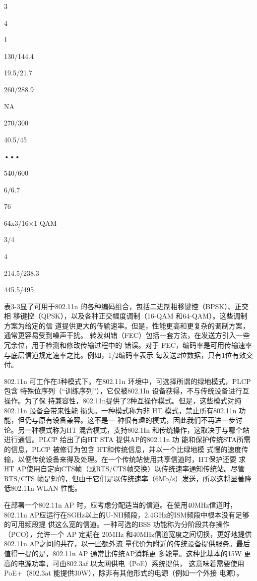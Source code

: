 3

4

1

130/144.4

19.5/21.7

260/288.9

NA

270/300

40.5/45

•••

540/600

6/6.7

76

64x3/16×1-QAM

3/4

4

214.5/238.3

445.5/495

表3-3显了可用于802.11n 的各种编码组合，包括二进制相移键控（BPSK）、正交相
移键控（QPSK），以及各种正交幅度调制（16-QAM 和64-QAM）。这些调制方案为给定的信
道提供更大的传输速率。但是，性能更高和更复杂的调制方案，通常更容易受到噪声干扰。
转发纠错（FEC）包括一套方法，在发送方引入一些冗余位，用于检测和修改传输过程中的
错误。对于 FEC，编码率是可用传输速率与底层信道规定速率之比。例如，1/2编码率表示
每发送2位数据，只有1位有效交付。

802.11n 可工作在3种模式下。在802.11n 环境中，可选择所谓的绿地模式，PLCP包含
特殊位序列（“训练序列”），它仅被802.1In 设备获得，不与传统设备进行互操作。为了保
持兼容性，802.11n提供了2种互操作模式。但是，这些模式对纯802.11n 设备会带来性能
损失。一种模式称为非 HT 模式，禁止所有802.11n 功能，但仍与原有设备兼容。这不是一
种很有趣的模式，因此我们不再进一步讨论。另一种模式称为HT 混合模式，支持802.1In
和传统操作，这取决于与哪个站进行通信。PLCP 给出了向HT STA 提供AP的802.11n 功
能和保护传统STA所需的信息，PLCP 被修订为包含 HT和传统信息，并以一个比绿地模
式慢的速度传输，以便传统设备来得及处理。在一个传统站使用共享信道时，HT保护还要
求 HT AP使用自定向CTS帧（或RTS/CTS帧交换）以传统速率通知传统站。尽管 RTS/CTS
帧是短的，但由于它们是以传统速率（6Mb/s）发送，所以这将显著降低802.11n WLAN
性能。

在部署一个802.11n AP 时，应考虑分配适当的信道。在使用40MHz信道时，802.11n
AP应运行在SGHz以上的U-NII频段，2.4GHz的ISM频段中根本没有足够的可用频段提
供这么宽的信道。一种可选的BSS 功能称为分阶段共存操作（PCO），允许一个 AP 定期在
20MHz 和40MHz信道宽度之间切换，更好地提供802.11n AP之间的共存，以一些额外流
量代价为附近的传统设备提供服务。最后值得一提的是，802.11n AP 通常比传统AP消耗更
多能量。这种比基本的15W 更高的电源功率，可由802.3af 以太网供电（PoE）系统提供，
这意味着需要使用 PoE+（802.3at 能提供30W），除非有其他形式的电源（例如一个外接
电源）。

